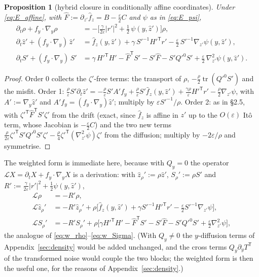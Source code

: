 \documentclass[11pt,a4paper]{article}
\newcommand{\tr}{\operatorname{tr}}
\newcommand{\T}{^{\mathsf T}}
\newcommand{\zh}{\hat{z}}
\newcommand{\zr}{\hat{z}_{\rho}}   %
\newcommand{\Sr}{S_{\rho}}          %
\newcommand{\eps}{\varepsilon}
\newcommand{\abs}[1]{\left\lvert #1 \right\rvert}
\newcommand{\gy}{\nabla_{\!y}}
\theoremstyle{plain}
\newtheorem{proposition}{Proposition}
\theoremstyle{definition}
\theoremstyle{remark}
\begin{document}
\begin{proposition}[hybrid closure in conditionally affine coordinates]
Under \eqref{eq:E_affine}, with $\hat F := \partial_{z'}\hat f_z = B - \tfrac\eps2C$ and $\psi$ as in \eqref{eq:E_psi},
\begin{align}
  \partial_t\rho + f_y\cdot\gy\rho &= -\Big[\frac{\gamma}{2\eps}\abs{r'}^2 + \frac12\,\psi(y,\zh')\Big]\rho , \label{eq:E_rho}\\
  \partial_t\zh' + (f_y\cdot\gy)\,\zh' &= \hat f_z(y,\zh') + \gamma\,{S'}^{-1}{H'}\T r' - \frac\eps2\,{S'}^{-1}\nabla_{z'}\psi(y,\zh') , \label{eq:E_z}\\
  \partial_tS' + (f_y\cdot\gy)\,S' &= \gamma\,{H'}\T H' - \hat F\T S' - S'\hat F - S'{Q'}^0S' + \frac\eps2\,\nabla_{z'}^2\psi(y,\zh') . \label{eq:E_S}
\end{align}
\end{proposition}
\begin{proof}
Order 0 collects the $\zeta'$-free terms: the transport of $\rho$, $-\tfrac\rho2\tr({Q'}^0S')$ and the misfit. Order 1: $\tfrac\rho\eps S'\partial_t\zh' = -\tfrac\rho\eps S'A'f_y + \tfrac\rho\eps S'\hat f_z(y,\zh') + \tfrac{\gamma\rho}\eps {H'}\T r' - \tfrac\rho2\nabla_{z'}\psi$, with $A' := \gy\zh'$ and $A'f_y = (f_y\cdot\gy)\zh'$; multiply by $\eps {S'}^{-1}/\rho$. Order 2: as in \S2.5, with ${\zeta'}\T\hat F\T S'\zeta'$ from the drift (exact, since $\hat f_z$ is affine in $z'$ up to the $O(\eps)$ It\^o term, whose Jacobian is $-\tfrac\eps2C$) and the two new terms $\tfrac{\rho}{2\eps}{\zeta'}\T S'{Q'}^0S'\zeta' - \tfrac\rho4{\zeta'}\T(\nabla^2_{z'}\psi)\zeta'$ from the diffusion; multiply by $-2\eps/\rho$ and symmetrise.
\end{proof}

The weighted form is immediate here, because with $Q_y=0$ the operator $\mathcal LX = \partial_tX + f_y\cdot\gy X$ is a derivation: with $\zr' := \rho\zh'$, $\Sr' := \rho S'$ and $R' := \tfrac{\gamma}{2\eps}\abs{r'}^2 + \tfrac12\psi(y,\zh')$,
\begin{align}
  \mathcal L\rho &= -R'\rho, \label{eq:E_w_rho}\\
  \mathcal L\zr' &= -R'\zr' + \rho\Big[\hat f_z(y,\zh') + \gamma {S'}^{-1}{H'}\T r' - \tfrac\eps2 {S'}^{-1}\nabla_{z'}\psi\Big], \label{eq:E_w_z}\\
  \mathcal L\Sr' &= -R'\Sr' + \rho\Big[\gamma {H'}\T H' - \hat F\T S' - S'\hat F - S'{Q'}^0S' + \tfrac\eps2\nabla_{z'}^2\psi\Big], \label{eq:E_w_S}
\end{align}
the analogue of \eqref{eq:w_rho}--\eqref{eq:w_Sigma}. (With $Q_y\ne0$ the $y$-diffusion terms of Appendix~\ref{sec:density} would be added unchanged, and the cross terms $Q_y\partial_yT\T$ of the transformed noise would couple the two blocks; the weighted form is then the useful one, for the reasons of Appendix~\ref{sec:density}.)
\end{document}
